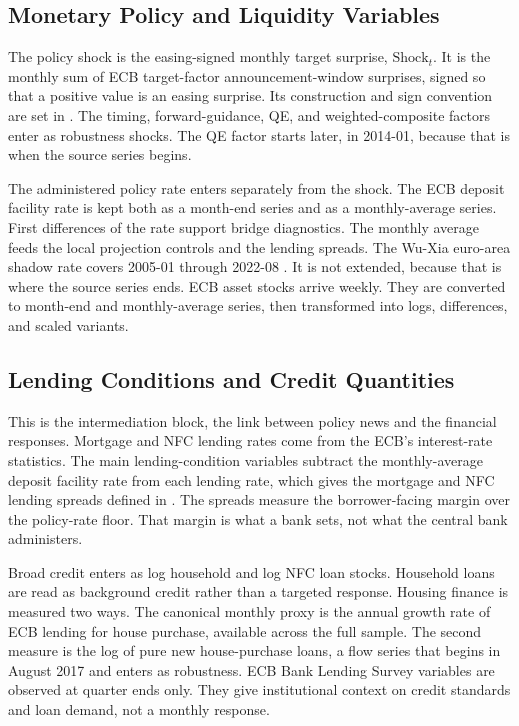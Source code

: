 \subsection{Monetary Policy and Liquidity Variables}

The policy shock is the easing-signed monthly target surprise, \(\mathrm{Shock}_t\). It is the monthly sum of ECB target-factor announcement-window surprises, signed so that a positive value is an easing surprise. Its construction and sign convention are set in . The timing, forward-guidance, QE, and weighted-composite factors enter as robustness shocks. The QE factor starts later, in 2014-01, because that is when the source series begins.

The administered policy rate enters separately from the shock. The ECB deposit facility rate \parencite{FREDECBDFR} is kept both as a month-end series and as a monthly-average series. First differences of the rate support bridge diagnostics. The monthly average feeds the local projection controls and the lending spreads. The Wu-Xia euro-area shadow rate covers 2005-01 through 2022-08 \parencite{WuXia2016,WuXia2020,WuXiaShadowRateData}. It is not extended, because that is where the source series ends. ECB asset stocks \parencite{FREDECBASSETSW} arrive weekly. They are converted to month-end and monthly-average series, then transformed into logs, differences, and scaled variants.

\subsection{Lending Conditions and Credit Quantities}

This is the intermediation block, the link between policy news and the financial responses. Mortgage and NFC lending rates come from the ECB's interest-rate statistics. The main lending-condition variables subtract the monthly-average deposit facility rate from each lending rate, which gives the mortgage and NFC lending spreads defined in . The spreads measure the borrower-facing margin over the policy-rate floor. That margin is what a bank sets, not what the central bank administers.

Broad credit enters as log household and log NFC loan stocks. Household loans are read as background credit rather than a targeted response. Housing finance is measured two ways. The canonical monthly proxy is the annual growth rate of ECB lending for house purchase, available across the full sample. The second measure is the log of pure new house-purchase loans, a flow series that begins in August 2017 and enters as robustness. ECB Bank Lending Survey variables are observed at quarter ends only. They give institutional context on credit standards and loan demand, not a monthly response.

